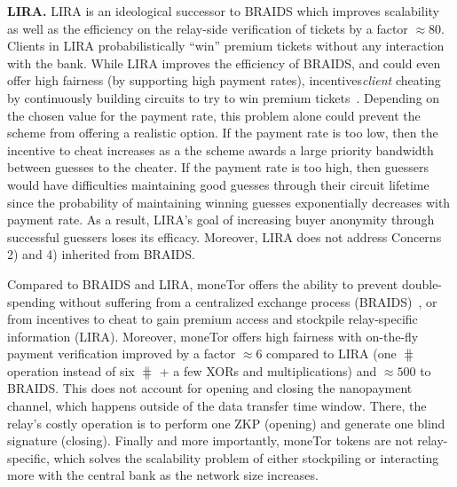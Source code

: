 \medskip\noindent\textbf{LIRA.}
LIRA is an ideological successor to BRAIDS which improves scalability as well as the efficiency on the relay-side verification of tickets by a factor $\approx 80$.
Clients in LIRA probabilistically ``win'' premium tickets without any interaction with the bank.
While LIRA improves the efficiency of BRAIDS, and could even offer high fairness (by supporting high payment rates), incentives\textit{client} cheating by continuously building circuits to try to win premium tickets~\cite{jansen2013lira, jansenblogpost}.
Depending on the chosen value for the payment rate, this problem alone could prevent the scheme from offering a realistic option.
If the payment rate is too low, then the incentive to cheat increases as a the scheme awards a large priority bandwidth between guesses to the cheater.
If the payment rate is too high, then guessers would have difficulties maintaining good guesses through their circuit lifetime since the probability of maintaining winning guesses exponentially decreases with payment rate.
As a result, LIRA's goal of increasing buyer anonymity through successful guessers loses its efficacy.
Moreover, LIRA does not address Concerns 2) and 4) inherited from BRAIDS.

Compared to BRAIDS and LIRA, moneTor offers the ability to prevent double-spending without suffering from a centralized exchange process (BRAIDS)~\cite{jansenblogpost}, or from incentives to cheat to gain premium access and stockpile relay-specific information (LIRA).
Moreover, moneTor offers high fairness with on-the-fly payment verification improved by a factor $\approx 6$ compared to LIRA (one $\hash$ operation instead of six $\hash$ + a few XORs and multiplications) and $\approx 500$ to BRAIDS.
This does not account for opening and closing the nanopayment channel, which happens outside of the data transfer time window.
There, the relay's costly operation is to perform one ZKP (opening) and generate one blind signature (closing).
Finally and more importantly, moneTor tokens are not relay-specific, which solves the scalability problem of either stockpiling or interacting more with the central bank as the network size increases.

